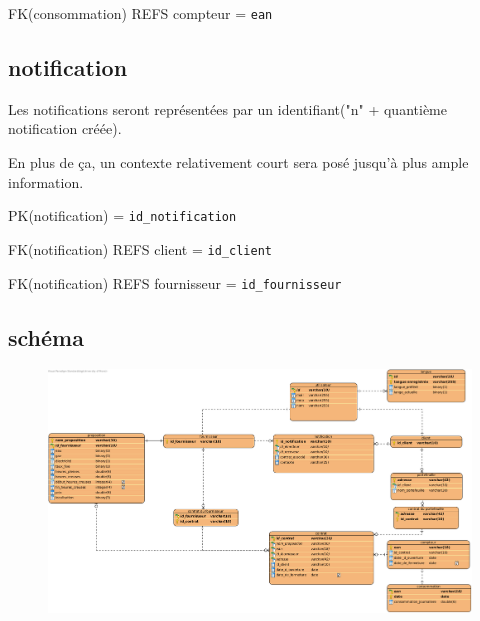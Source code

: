 \begin{flushleft}
FK(consommation) REFS compteur = \texttt{ean}
\end{flushleft}
\newpage
\subsection{notification}
\begin{flushleft}
Les notifications seront représentées par un identifiant("n" + quantième notification créée).
\end{flushleft}

\begin{flushleft}
En plus de ça, un contexte relativement court sera posé jusqu'à plus ample information.
\end{flushleft}

\begin{flushleft}
PK(notification) = \texttt{id\_notification}
\end{flushleft}

\begin{flushleft}
FK(notification) REFS client = \texttt{id\_client}

FK(notification) REFS fournisseur = \texttt{id\_fournisseur}
\end{flushleft}
\subsection{schéma}
\begin{figure}[h]
\includegraphics[scale=0.4]{bdd/bdd.png}
\end{figure}